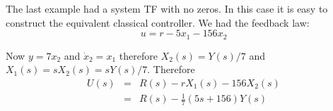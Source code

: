 The last example had a system TF with no zeros. In this case it is easy to construct the equivalent classical controller. We had the feedback law:
\[
u=r-5x_1-156x_2
\]

Now $y=7x_2$ and $\dot{x}_2=x_1$ therefore $X_2(s)=Y(s)/7$ and $X_1(s)=sX_2(s)=sY(s)/7$. Therefore
\begin{eqnarray*}
	U(s) & = & R(s)-rX_1(s)-156X_2(s) \\
	& = & R(s) - \frac{1}{7}(5s+156)Y(s)
\end{eqnarray*}

\endinput

